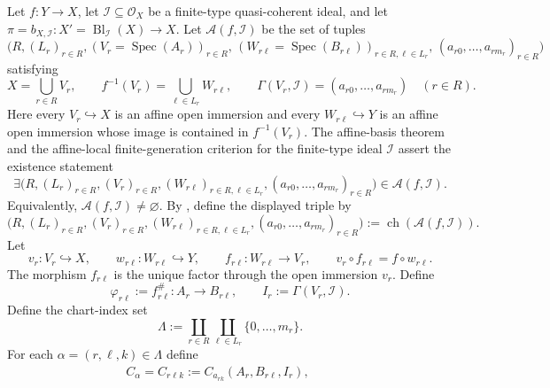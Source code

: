 \begin{definition}
  \label{def:nagata-strict-transform-closed-chart-model}

  Let $f\colon Y\to X$, let
  $\mathcal I\subseteq\mathcal O_X$ be a finite-type quasi-coherent ideal,
  and let
  $\pi=b_{X,\mathcal I}\colon X'=\operatorname{Bl}_{\mathcal I}(X)\to X$.
  Let $\mathscr A(f,\mathcal I)$ be the set of tuples
  \[
    \bigl(R,(L_r)_{r\in R},
          (V_r=\operatorname{Spec}(A_r))_{r\in R},\,
          (W_{r\ell}=\operatorname{Spec}(B_{r\ell}))_
            {r\in R,\ell\in L_r},\,
          (a_{r0},\ldots,a_{rm_r})_{r\in R}\bigr)
  \]
  satisfying
  \[
    X=\bigcup_{r\in R}V_r,\qquad
    f^{-1}(V_r)=\bigcup_{\ell\in L_r}W_{r\ell},\qquad
    \Gamma(V_r,\mathcal I)=(a_{r0},\ldots,a_{rm_r})
      \quad(r\in R).
  \]
  Here every $V_r\hookrightarrow X$ is an affine open immersion and every
  $W_{r\ell}\hookrightarrow Y$ is an affine open immersion whose image is
  contained in $f^{-1}(V_r)$.
  The affine-basis theorem and the affine-local finite-generation criterion
  for the finite-type ideal $\mathcal I$ assert the existence statement
  \[
    \exists\bigl(R,(L_r)_{r\in R},(V_r)_{r\in R},
      (W_{r\ell})_{r\in R,\ell\in L_r},
      (a_{r0},\ldots,a_{rm_r})_{r\in R}\bigr)
      \in\mathscr A(f,\mathcal I).
  \]
  Equivalently,
  $\mathscr A(f,\mathcal I)\ne\varnothing$.  By
  , define the displayed triple by
  \[
    \bigl(R,(L_r)_{r\in R},(V_r)_{r\in R},
      (W_{r\ell})_{r\in R,\ell\in L_r},
      (a_{r0},\ldots,a_{rm_r})_{r\in R}\bigr)
      :=\operatorname{ch}(\mathscr A(f,\mathcal I)).
  \]
  Let
  \[
    v_r\colon V_r\hookrightarrow X,\qquad
    w_{r\ell}\colon W_{r\ell}\hookrightarrow Y,\qquad
    f_{r\ell}\colon W_{r\ell}\longrightarrow V_r,
    \qquad
    v_r\circ f_{r\ell}=f\circ w_{r\ell}.
  \]
  The morphism $f_{r\ell}$ is the unique factor through the open immersion
  $v_r$.  Define
  \[
    \varphi_{r\ell}:=f_{r\ell}^{\#}\colon A_r\to B_{r\ell},
    \qquad I_r:=\Gamma(V_r,\mathcal I).
  \]
  Define the chart-index set
  \[
    \Lambda:=\coprod_{r\in R}\coprod_{\ell\in L_r}
      \{0,\ldots,m_r\}.
  \]
  For each $\alpha=(r,\ell,k)\in\Lambda$ define
  \[
  \begin{gathered}
    C_\alpha=C_{r\ell k}:=C_{a_{rk}}(A_r,B_{r\ell},I_r),\qquad

\end{gathered}\]
\end{definition}
